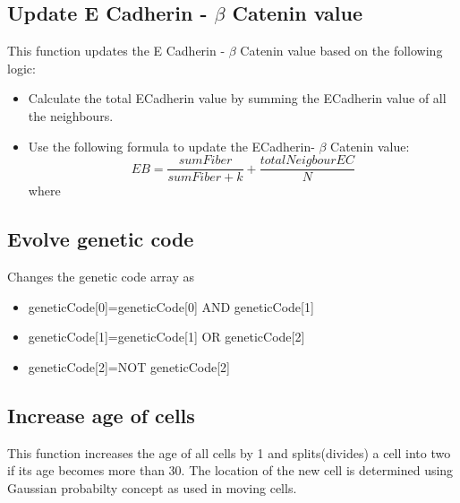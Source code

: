 \documentclass[11pt]{report}
\begin{document}
  \subsection{\color{blue}Update E Cadherin - $ \beta $ Catenin value}
  This function updates the E Cadherin - $ \beta $ Catenin value based on the following logic:
  \begin{itemize}
   \item Calculate the total ECadherin value by summing the ECadherin value of all the neighbours.
   \item Use the following formula to update the ECadherin- $\beta$ Catenin value:\\
   \begin{equation}
    EB = \frac{sumFiber}{sumFiber+k} + \frac{totalNeigbourEC}{N}
   \end{equation}
   where
   \end{itemize}
   \subsection{\color{blue}Evolve genetic code}
   Changes the genetic code array as
   \begin{itemize}
    \item geneticCode[0]=geneticCode[0] AND geneticCode[1]
    \item geneticCode[1]=geneticCode[1] OR geneticCode[2]
    \item geneticCode[2]=NOT geneticCode[2]
   \end{itemize}

  \subsection{\color{blue}Increase age of cells}
  This function increases the age of all cells by 1 and splits(divides) a cell into two if its age becomes more than 30.
  The location of the new cell is determined using Gaussian probabilty concept as used in moving cells.
\end{document}
